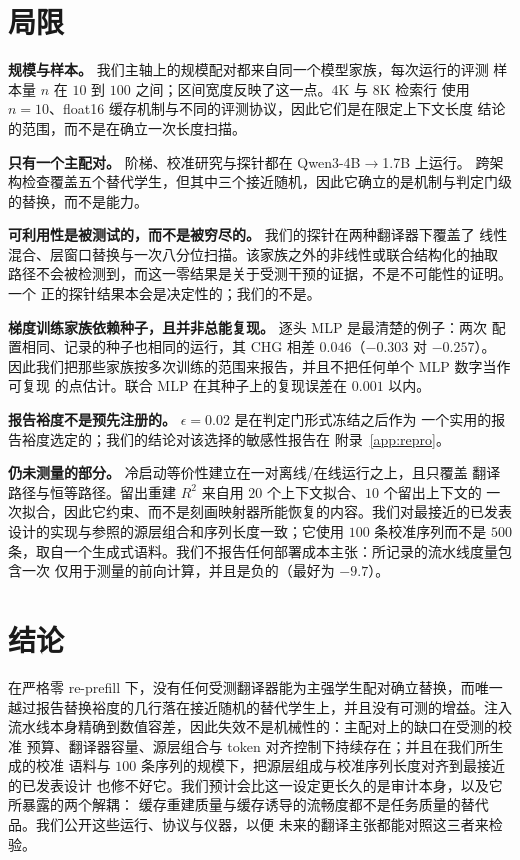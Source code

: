 \documentclass[10pt,a4paper,fontset=fandol]{ctexart}
\begin{document}
\section{局限}
\label{sec:limitations}

\textbf{规模与样本。} 我们主轴上的规模配对都来自同一个模型家族，每次运行的评测
样本量 $n$ 在 $10$ 到 $100$ 之间；区间宽度反映了这一点。$4$K 与 $8$K 检索行
使用 $n{=}10$、float16 缓存机制与不同的评测协议，因此它们是在限定上下文长度
结论的范围，而不是在确立一次长度扫描。

\textbf{只有一个主配对。} 阶梯、校准研究与探针都在 Qwen3-4B$\to$1.7B 上运行。
跨架构检查覆盖五个替代学生，但其中三个接近随机，因此它确立的是机制与判定门级
的替换，而不是能力。

\textbf{可利用性是被测试的，而不是被穷尽的。} 我们的探针在两种翻译器下覆盖了
线性混合、层窗口替换与一次八分位扫描。该家族之外的非线性或联合结构化的抽取
路径不会被检测到，而这一零结果是关于受测干预的证据，不是不可能性的证明。一个
正的探针结果本会是决定性的；我们的不是。

\textbf{梯度训练家族依赖种子，且并非总能复现。} 逐头 MLP 是最清楚的例子：两次
配置相同、记录的种子也相同的运行，其 CHG 相差 $0.046$（$-0.303$ 对 $-0.257$）。
因此我们把那些家族按多次训练的范围来报告，并且不把任何单个 MLP 数字当作可复现
的点估计。联合 MLP 在其种子上的复现误差在 $0.001$ 以内。

\textbf{报告裕度不是预先注册的。} $\epsilon{=}0.02$ 是在判定门形式冻结之后作为
一个实用的报告裕度选定的；我们的结论对该选择的敏感性报告在
附录~\ref{app:repro}。

\textbf{仍未测量的部分。} 冷启动等价性建立在一对离线/在线运行之上，且只覆盖
翻译路径与恒等路径。留出重建 $R^2$ 来自用 $20$ 个上下文拟合、$10$ 个留出上下文的
一次拟合，因此它约束、而不是刻画映射器所能恢复的内容。我们对最接近的已发表
设计的实现与参照的源层组合和序列长度一致；它使用 $100$ 条校准序列而不是 $500$
条，取自一个生成式语料。我们不报告任何部署成本主张：所记录的流水线度量包含一次
仅用于测量的前向计算，并且是负的（最好为 $-9.7$）。

\section{结论}
\label{sec:conclusion}

在严格零 re-prefill 下，没有任何受测翻译器能为主强学生配对确立替换，而唯一
越过报告替换裕度的几行落在接近随机的替代学生上，并且没有可测的增益。注入
流水线本身精确到数值容差，因此失效不是机械性的：主配对上的缺口在受测的校准
预算、翻译器容量、源层组合与 token 对齐控制下持续存在；并且在我们所生成的校准
语料与 $100$ 条序列的规模下，把源层组成与校准序列长度对齐到最接近的已发表设计
也修不好它。我们预计会比这一设定更长久的是审计本身，以及它所暴露的两个解耦：
缓存重建质量与缓存诱导的流畅度都不是任务质量的替代品。我们公开这些运行、协议与仪器，以便
未来的翻译主张都能对照这三者来检验。
\end{document}
